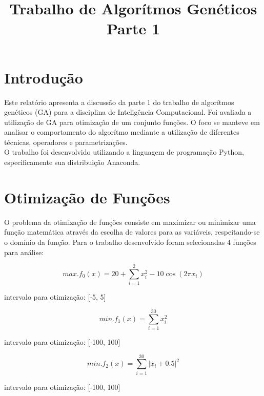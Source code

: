\documentclass[conference]{IEEEtran}
\begin{document}
\title{Trabalho de Algorítmos Genéticos\\ Parte 1}


\author{
}

\maketitle


\section{Introdução}
Este relatório apresenta a discussão da parte 1 do trabalho de algorítmos
genéticos (GA) para a disciplina de Inteligência Computacional. Foi avaliada a
utilização de GA para otimização de um conjunto funções. O foco se manteve em
analisar o comportamento do algorítmo mediante a utilização de
diferentes técnicas, operadores e parametrizações.\\
O trabalho foi desenvolvido utilizando a linguagem de programação Python,
especificamente sua distribuição Anaconda.\\


\section{Otimização de Funções}
O problema da otimização de funções consiste em maximizar ou minimizar uma 
função matemática através da escolha de valores para as variáveis,
respeitando-se o domínio da função.
Para o trabalho desenvolvido foram selecionadas 4 funções para análise:

\[max. f_0(x) = 20 + \sum_{i=1}^{2} x_{i}^{2} - 10\cos(2\pi x_i)\]
\begin{center}intervalo para otimização: [-5, 5]\\\end{center}

\[min. f_1(x) = \sum_{i=1}^{30} x_{i}^{2}\]
\begin{center}intervalo para otimização: [-100, 100]\\\end{center}

\[min. f_2(x) = \sum_{i=1}^{30} \left|x_i + 0.5\right|^{2}\]
\begin{center}intervalo para otimização: [-100, 100]\\\end{center}
\end{document}
